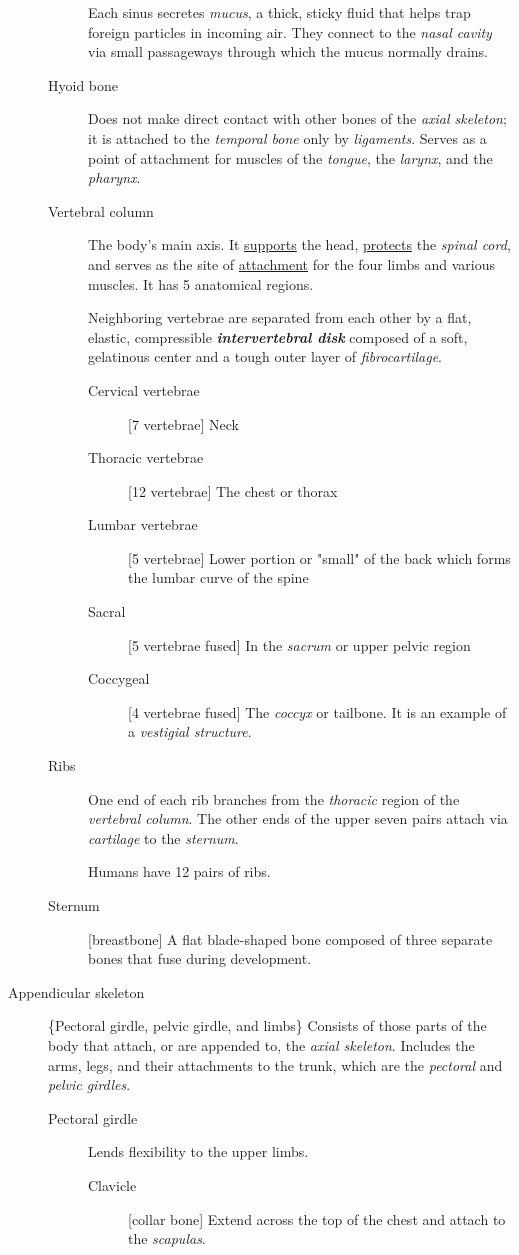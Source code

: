 \documentclass[11pt]{article}
\begin{document}
\begin{description}
\begin{description}
Each sinus secretes \emph{mucus}, a thick, sticky fluid that helps trap
foreign particles in incoming air. They connect to the \emph{nasal cavity}
via small passageways through which the mucus normally drains.
\item[{Hyoid bone}] Does not make direct contact with other bones of the
\emph{axial skeleton}; it is attached to the \emph{temporal bone} only by
\emph{ligaments}. Serves as a point of attachment for muscles of the
\emph{tongue}, the \emph{larynx}, and the \emph{pharynx}.
\item[{Vertebral column}] The body's main axis. It \uline{supports} the head,
\uline{protects} the \emph{spinal cord}, and serves as the site of \uline{attachment}
for the four limbs and various muscles. It has 5 anatomical regions.

Neighboring vertebrae are separated from each other by a flat,
elastic, compressible \emph{\textbf{intervertebral disk}} composed of a soft,
gelatinous center and a tough outer layer of \emph{fibrocartilage}.
\begin{description}
\item[{Cervical vertebrae}] [7 vertebrae] Neck
\item[{Thoracic vertebrae}] [12 vertebrae] The chest or thorax
\item[{Lumbar vertebrae}] [5 vertebrae] Lower portion or "small" of the back
which forms the lumbar curve of the spine
\item[{Sacral}] [5 vertebrae fused] In the \emph{sacrum} or upper pelvic region
\item[{Coccygeal}] [4 vertebrae fused] The \emph{coccyx} or tailbone. It is an
example of a \emph{vestigial structure}.
\end{description}
\item[{Ribs}] One end of each rib branches from the \emph{thoracic} region of the
\emph{vertebral column}. The other ends of the upper seven pairs attach
via \emph{cartilage} to the \emph{sternum}.

Humans have 12 pairs of ribs.
\item[{Sternum}] [breastbone] A flat blade-shaped bone composed of three
separate bones that fuse during development.
\end{description}
\item[{Appendicular skeleton}] \{Pectoral girdle, pelvic girdle, and limbs\}
Consists of those parts of the body that attach, or are appended to,
the \emph{axial skeleton}. Includes the arms, legs, and their attachments to
the trunk, which are the \emph{pectoral} and \emph{pelvic girdles}.
\begin{description}
\item[{Pectoral girdle}] Lends flexibility to the upper limbs. 
\begin{description}
\item[{Clavicle}] [collar bone] Extend across the top of the chest and
attach to the \emph{scapulas}.


\end{description}
\end{description}
\end{description}
\end{document}
